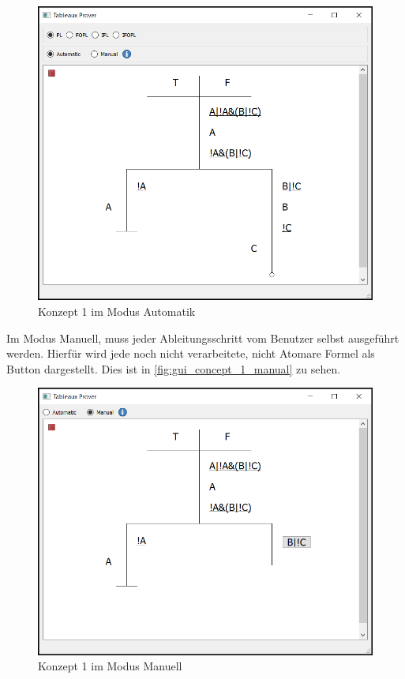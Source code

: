 \begin{figure}[h]
\begin{center}
\includegraphics[scale=0.7]{images/gui_concept_1_automatic.png}
\caption{Konzept 1 im Modus Automatik}
\label{fig:gui_concept_1_automatic}
\end{center}
\end{figure}

Im Modus Manuell, muss jeder Ableitungsschritt vom Benutzer selbst ausgeführt werden. Hierfür wird jede noch nicht verarbeitete, nicht Atomare Formel als Button dargestellt. Dies ist in \autoref{fig:gui_concept_1_manual} zu sehen.

\begin{figure}[h]
\begin{center}
\includegraphics[scale=0.7]{images/gui_concept_1_manual.png}
\caption{Konzept 1 im Modus Manuell}
\label{fig:gui_concept_1_manual}
\end{center}
\end{figure}

